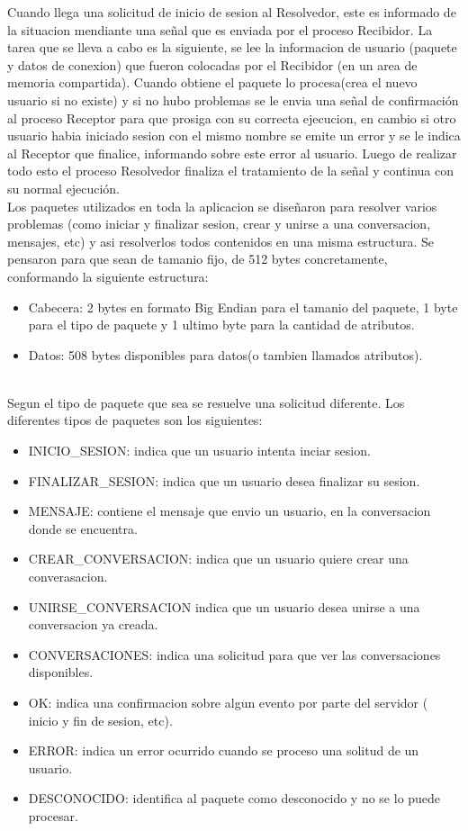 \documentclass[a4paper,12pt,titlepage]{article}
\begin{document}
Cuando llega una solicitud de inicio de sesion al Resolvedor, este es informado de la situacion mendiante una señal que es enviada por el proceso Recibidor. La tarea que se lleva a cabo es la siguiente, se lee la informacion de usuario (paquete y datos de conexion) que fueron colocadas por el Recibidor (en un area de memoria compartida). Cuando obtiene el paquete lo procesa(crea el nuevo usuario si no existe) y si no hubo problemas se le envia una señal de confirmación al proceso Receptor para que prosiga con su correcta ejecucion, en cambio si otro usuario habia iniciado sesion con el mismo nombre se emite un error y se le indica al Receptor que finalice, informando sobre este error al usuario. Luego de realizar todo esto el proceso Resolvedor finaliza el tratamiento de la señal y continua con su normal ejecución.\\


Los paquetes utilizados en toda la aplicacion se diseñaron para resolver varios problemas (como iniciar y finalizar sesion, crear y unirse a una conversacion, mensajes, etc) y asi resolverlos todos contenidos en una misma estructura.
Se pensaron para que sean de tamanio fijo, de 512 bytes concretamente, conformando la siguiente estructura:

\begin{itemize}
\item Cabecera: 2 bytes en formato Big Endian para el tamanio del paquete, 1 byte para el tipo de paquete y 1 ultimo byte para la cantidad de atributos.
\item Datos: 508 bytes disponibles para datos(o tambien llamados atributos).
\end{itemize}\\

Segun el tipo de paquete que sea se resuelve una solicitud diferente. Los diferentes tipos de paquetes son los siguientes:
\begin{itemize}
\item INICIO_SESION: indica que un usuario intenta inciar sesion.
\item FINALIZAR_SESION: indica que un usuario desea finalizar su sesion.
\item MENSAJE: contiene el mensaje que envio un usuario, en la conversacion donde se encuentra.
\item CREAR_CONVERSACION: indica que un usuario quiere crear una converasacion.
\item UNIRSE_CONVERSACION indica que un usuario desea unirse a una conversacion ya creada.
\item CONVERSACIONES: indica una solicitud para que ver las conversaciones disponibles.
\item OK: indica una confirmacion sobre algun evento por parte del servidor ( inicio y fin de sesion, etc).
\item ERROR: indica un error ocurrido cuando se proceso una solitud de un usuario.
\item DESCONOCIDO: identifica al paquete como desconocido y no se lo puede procesar.

\end{itemize}\\
\end{document}
